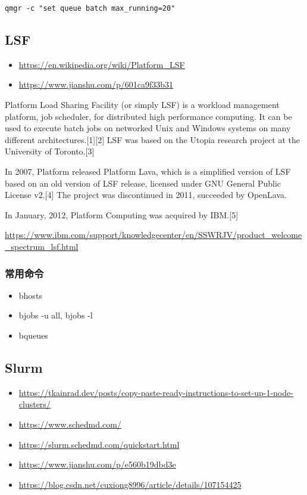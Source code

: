 {\verb|qmgr -c "set queue batch max_running=20"|



\subsection{LSF}
\begin{itemize}
\item \url{https://en.wikipedia.org/wiki/Platform_LSF}
\item \url{https://www.jianshu.com/p/601ca9f33b31}
\end{itemize}


Platform Load Sharing Facility (or simply LSF) is a workload management platform, job scheduler, for distributed high performance computing. It can be used to execute batch jobs on networked Unix and Windows systems on many different architectures.[1][2] LSF was based on the Utopia research project at the University of Toronto.[3]

In 2007, Platform released Platform Lava, which is a simplified version of LSF based on an old version of LSF release, licensed under GNU General Public License v2.[4] The project was discontinued in 2011, succeeded by OpenLava.

In January, 2012, Platform Computing was acquired by IBM.[5]


\url{https://www.ibm.com/support/knowledgecenter/en/SSWRJV/product_welcome_spectrum_lsf.html}



\subsubsection{常用命令}
\begin{itemize}
\item bhosts
\item bjobs -u all, bjobs -l
\item bqueues
\end{itemize}




\subsection{Slurm}
\begin{itemize}
\item \url{https://tkainrad.dev/posts/copy-paste-ready-instructions-to-set-up-1-node-clusters/}
\item \url{https://www.schedmd.com/}
\item \url{https://slurm.schedmd.com/quickstart.html}
\item \url{https://www.jianshu.com/p/e560b19dbd3e}
\item \url{https://blog.csdn.net/cuxiong8996/article/details/107154425}
\end{itemize}


}
